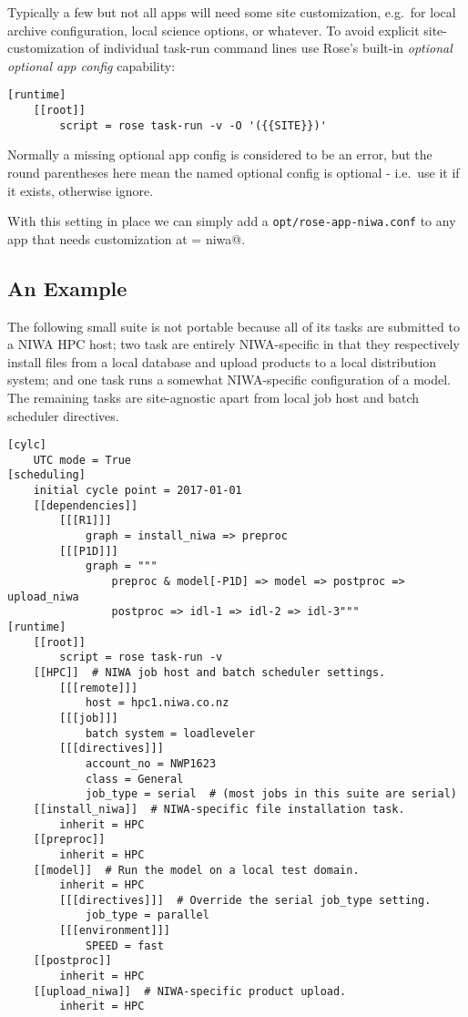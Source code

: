 Typically a few but not all apps will need some site customization, e.g.\ for
local archive configuration, local science options, or whatever. To avoid
explicit site-customization of individual task-run command lines use Rose's
built-in {\em optional optional app config} capability:

\lstset{language=suiterc}
\begin{lstlisting}
[runtime]
    [[root]]
        script = rose task-run -v -O '({{SITE}})'
\end{lstlisting}

Normally a missing optional app config is considered to be an error, but the 
round parentheses here mean the named optional config is optional - i.e.\
use it if it exists, otherwise ignore.

With this setting in place we can simply add a
\lstinline=opt/rose-app-niwa.conf= to any app that needs customization at
\lstinline@SITE = niwa@.

\subsection{An Example}

The following small suite is not portable because all of its tasks are
submitted to a NIWA HPC host; two task are entirely NIWA-specific in that they 
respectively install files from a local database and upload products to a local
distribution system; and one task runs a somewhat NIWA-specific configuration
of a model. The remaining tasks are site-agnostic apart from local job host
and batch scheduler directives.

\lstset{language=suiterc}
\begin{lstlisting}
[cylc]
    UTC mode = True
[scheduling]
    initial cycle point = 2017-01-01
    [[dependencies]]
        [[[R1]]]
            graph = install_niwa => preproc
        [[[P1D]]]
            graph = """
                preproc & model[-P1D] => model => postproc => upload_niwa
                postproc => idl-1 => idl-2 => idl-3"""
[runtime]
    [[root]]
        script = rose task-run -v
    [[HPC]]  # NIWA job host and batch scheduler settings.
        [[[remote]]]
            host = hpc1.niwa.co.nz
        [[[job]]]
            batch system = loadleveler
        [[[directives]]]
            account_no = NWP1623
            class = General
            job_type = serial  # (most jobs in this suite are serial)
    [[install_niwa]]  # NIWA-specific file installation task.
        inherit = HPC
    [[preproc]]
        inherit = HPC
    [[model]]  # Run the model on a local test domain.
        inherit = HPC
        [[[directives]]]  # Override the serial job_type setting.
            job_type = parallel
        [[[environment]]]
            SPEED = fast
    [[postproc]]
        inherit = HPC
    [[upload_niwa]]  # NIWA-specific product upload.
        inherit = HPC
\end{lstlisting}

